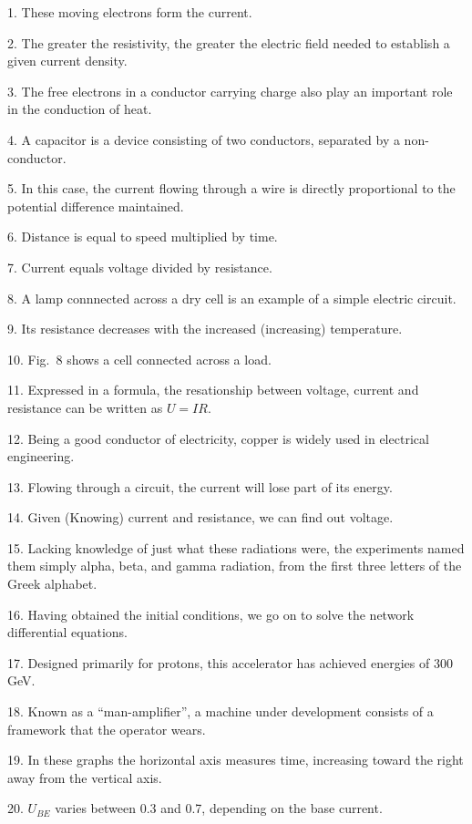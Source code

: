 \documentclass[a4paper,twocolumn,10pt]{article}
\begin{document}
\begin{CJK}{UTF8}{gkai}
	1. These moving electrons form the current.

	2. The greater the resistivity, the greater the electric field
	needed to establish a given current density.

	3. The free electrons in a conductor carrying charge also play
	an important role in the conduction of heat.

	4. A capacitor is a device consisting of two conductors,
	separated by a non-conductor.

	5. In this case, the current flowing through a wire is directly
	proportional to the potential difference maintained.

	6. Distance is equal to speed multiplied by time.

	7. Current equals voltage divided by resistance.

	8. A lamp connnected across a dry cell is an example of a
	simple electric circuit.

	9. Its resistance decreases with the increased (increasing)
	temperature.

	10. Fig.~8 shows a cell connected across a load.

	11. Expressed in a formula, the resationship between voltage,
	current and resistance can be written as $U=IR$.

	12. Being a good conductor of electricity, copper is widely used
	in electrical engineering.

	13. Flowing through a circuit, the current will lose part of
	its energy.

	14. Given (Knowing) current and resistance, we can find out voltage.

	15. Lacking knowledge of just what these radiations were,
	the experiments named them simply alpha, beta, and gamma radiation,
	from the first three letters of the Greek alphabet.

	16. Having obtained the initial conditions, we go on to solve the
	network differential equations.

	17. Designed primarily for protons, this accelerator has achieved
	energies of 300 GeV.

	18. Known as a ``man-amplifier'', a machine under development consists
	of a framework that the operator wears.

	19. In these graphs the horizontal axis measures time, increasing toward
	the right away from the vertical axis.

	20. $U_{BE}$ varies between 0.3 and 0.7, depending on the base current.


\end{CJK}
\end{document}
